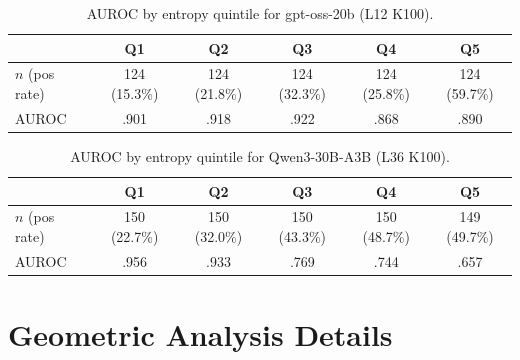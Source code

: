 \documentclass[11pt]{article}
\begin{document}
\begin{table}[H]
\caption{AUROC by entropy quintile for gpt-oss-20b (L12 K100).}
\label{tab:app_quintiles_gptoss}
\begin{center}
\begin{small}
\begin{sc}
\begin{tabular}{lccccc}
\toprule
 & Q1 & Q2 & Q3 & Q4 & Q5 \\
\midrule
$n$ (pos rate) & 124 (15.3\%) & 124 (21.8\%) & 124 (32.3\%) & 124 (25.8\%) & 124 (59.7\%) \\
AUROC & .901 & .918 & .922 & .868 & .890 \\
\bottomrule
\end{tabular}
\end{sc}
\end{small}
\end{center}
\end{table}

\begin{table}[H]
\caption{AUROC by entropy quintile for Qwen3-30B-A3B (L36 K100).}
\label{tab:app_quintiles_qwenmoe}
\begin{center}
\begin{small}
\begin{sc}
\begin{tabular}{lccccc}
\toprule
 & Q1 & Q2 & Q3 & Q4 & Q5 \\
\midrule
$n$ (pos rate) & 150 (22.7\%) & 150 (32.0\%) & 150 (43.3\%) & 150 (48.7\%) & 149 (49.7\%) \\
AUROC & .956 & .933 & .769 & .744 & .657 \\
\bottomrule
\end{tabular}
\end{sc}
\end{small}
\end{center}
\end{table}


\section{Geometric Analysis Details}
\label{app:geometry}
\end{document}
